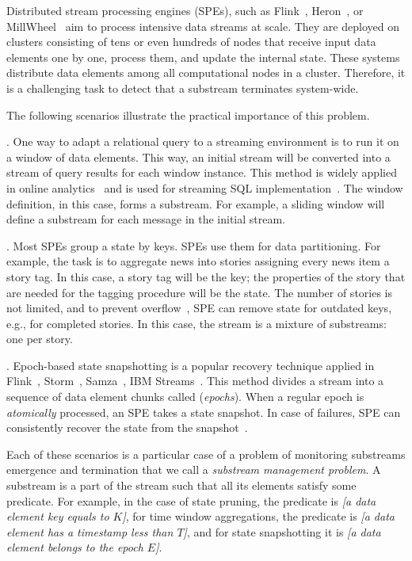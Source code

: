 Distributed stream processing engines (SPEs), such as Flink~\cite{carbone2015apache}, Heron~\cite{Kulkarni:2015:THS:2723372.2742788}, or MillWheel~\cite{Akidau:2013:MFS:2536222.2536229} aim to process intensive data streams at scale. They are deployed on clusters consisting of tens or even hundreds of nodes that receive input data elements one by one, process them, and update the internal state. These systems distribute data elements among all computational nodes in a cluster. Therefore, it is a challenging task to detect that a substream terminates system-wide. 

The following scenarios illustrate the practical importance of this problem.

. One way to adapt a relational query to a streaming environment is to run it on a window of data elements. This way, an initial stream will be converted into a stream of query results for each window instance. This method is widely applied in online analytics~\cite{traub2018scotty} and is used for streaming SQL implementation~\cite{Begoli:2019:OSR:3299869.3314040}. The window definition, in this case, forms a substream. For example, a sliding window will define a substream for each message in the initial stream.

. Most SPEs group a state by keys. SPEs use them for data partitioning. For example, the task is to aggregate news into stories assigning every news item a story tag. In this case, a story tag will be the key; the properties of the story that are needed for the tagging procedure will be the state. The number of stories is not limited, and to prevent overflow~\cite{Tucker:2003:EPS:776752.776780}, SPE can remove state for outdated keys, e.g., for completed stories. In this case, the stream is a mixture of substreams: one per story.  

. Epoch-based state snapshotting is a popular recovery technique applied in Flink~\cite{Carbone:2017:SMA:3137765.3137777}, Storm~\cite{Toshniwal:2014:STO:2588555.2595641}, Samza~\cite{Noghabi:2017:SSS:3137765.3137770}, IBM Streams~\cite{jacques2016consistent}. This method divides a stream into a sequence of data element chunks called ({\em epochs}). When a regular epoch is {\em atomically} processed, an SPE takes a state snapshot. In case of failures, SPE can consistently recover the state from the snapshot~\cite{2015arXiv150608603C}. 

Each of these scenarios is a particular case of a problem of monitoring substreams emergence and termination that we call a {\em substream management problem}. A substream is a part of the stream such that all its elements satisfy some predicate. 
For example, in the case of state pruning, the predicate is {\em [a data element key equals to $K$]}, for time window aggregations, the predicate is {\em [a data element has a timestamp less than $T$]}, and for state snapshotting it is {\em [a data element belongs to the epoch $E$]}.

